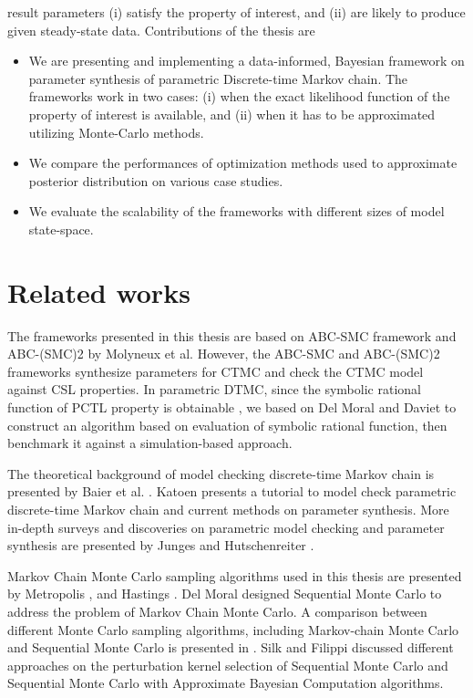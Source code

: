 result parameters (i) satisfy the property of interest, and (ii) are likely to produce given
steady-state data. Contributions of the thesis are
\begin{itemize}
      \item We are presenting and implementing a data-informed, Bayesian framework on parameter
            synthesis of parametric Discrete-time Markov chain. The frameworks work in two cases:
            (i) when the exact likelihood function of the property of interest is available, and
            (ii) when it has to be approximated utilizing Monte-Carlo methods.
      \item We compare the performances of optimization methods used to approximate posterior
            distribution on various case studies.
      \item We evaluate the scalability of the frameworks with different sizes of model state-space.
\end{itemize}

\section{Related works}
The frameworks presented in this thesis are based on ABC-SMC framework \cite{molyneux2019bayesian}
and ABC-(SMC)2 \cite{molyneux2020abc} by Molyneux et al. However, the ABC-SMC and ABC-(SMC)2
frameworks synthesize parameters for CTMC and check the CTMC model against CSL properties. In
parametric DTMC, since the symbolic rational function of PCTL property is obtainable
\cite{daws2004symbolic}, we based on Del Moral \cite{del2006sequential} and Daviet
\cite{daviet2018inference} to construct an algorithm based on evaluation of symbolic rational
function, then benchmark it against a simulation-based approach.

The theoretical background of model checking discrete-time Markov chain is presented by Baier et al.
\cite{baier2008principles}. Katoen \cite{katoen2016probabilistic} presents a tutorial to model check
parametric discrete-time Markov chain and current methods on parameter synthesis. More in-depth
surveys and discoveries on parametric model checking and parameter synthesis are presented by Junges
\cite{junges2020parameter} and Hutschenreiter \cite{hutschenreiter2017parametric}.

Markov Chain Monte Carlo sampling algorithms used in this thesis are presented by Metropolis
\cite{metropolis1953equation}, and Hastings \cite{hastings1970monte}. Del Moral
\cite{del2006sequential} designed Sequential Monte Carlo to address the problem of Markov Chain
Monte Carlo. A comparison between different Monte Carlo sampling algorithms, including Markov-chain
Monte Carlo and Sequential Monte Carlo is presented in \cite{daviet2018inference}. Silk
\cite{silk2012optimizing} and Filippi \cite{filippi2013optimality} discussed different approaches on
the perturbation kernel selection of Sequential Monte Carlo and Sequential Monte Carlo with
Approximate Bayesian Computation algorithms.

